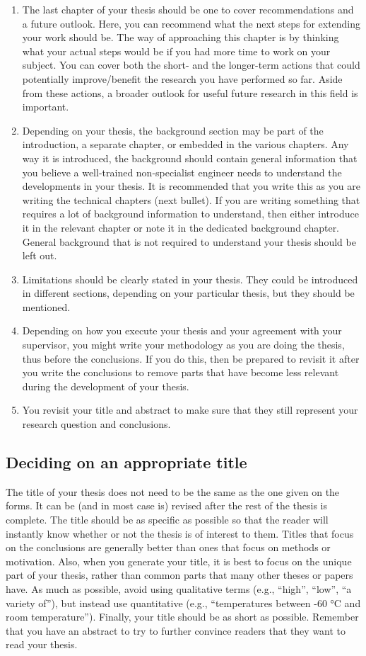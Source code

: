 \documentclass{article}
\begin{document}
\begin{enumerate}
    \item The last chapter of your thesis should be one to cover recommendations and a future outlook. Here, you can recommend what the next steps for extending your work should be. The way of approaching this chapter is by thinking what your actual steps would be if you had more time to work on your subject. You can cover both the short- and the longer-term actions that could potentially improve/benefit the research you have performed so far. Aside from these actions, a broader outlook for useful future research in this field is important. 
    \item Depending on your thesis, the background section may be part of the introduction, a separate chapter, or embedded in the various chapters. Any way it is introduced, the background should contain general information that you believe a well-trained non-specialist engineer needs to understand the developments in your thesis. It is recommended that you write this as you are writing the technical chapters (next bullet). If you are writing something that requires a lot of background information to understand, then either introduce it in the relevant chapter or note it in the dedicated background chapter. General background that is not required to understand your thesis should be left out.
    \item Limitations should be clearly stated in your thesis. They could be introduced in different sections, depending on your particular thesis, but they should be mentioned.
    \item Depending on how you execute your thesis and your agreement with your supervisor, you might write your methodology as you are doing the thesis, thus before the conclusions. If you do this, then be prepared to revisit it after you write the conclusions to remove parts that have become less relevant during the development of your thesis.
    \item You revisit your title and abstract to make sure that they still represent your research question and conclusions.
\end{enumerate}

\subsection{Deciding on an appropriate title}
The title of your thesis does not need to be the same as the one given on the forms. It can be (and in most case is) revised after the rest of the thesis is complete. The title should be as specific as possible so that the reader will instantly know whether or not the thesis is of interest to them. Titles that focus on the conclusions are generally better than ones that focus on methods or motivation. Also, when you generate your title, it is best to focus on the unique part of your thesis, rather than common parts that many other theses or papers have. As much as possible, avoid using qualitative terms (e.g., “high”, “low”, “a variety of”), but instead use quantitative (e.g., “temperatures between -60 °C and room temperature”). Finally, your title should be as short as possible. Remember that you have an abstract to try to further convince readers that they want to read your thesis.
\end{document}
